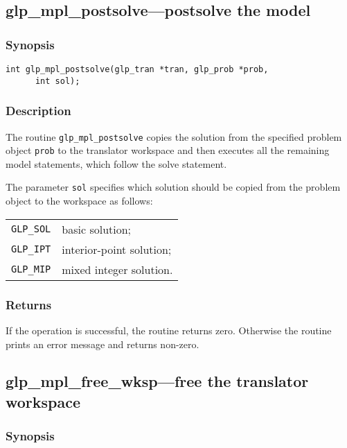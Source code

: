 \subsection{glp\_mpl\_postsolve---postsolve the model}

\subsubsection*{Synopsis}

\begin{verbatim}
int glp_mpl_postsolve(glp_tran *tran, glp_prob *prob,
      int sol);
\end{verbatim}

\subsubsection*{Description}

The routine \verb|glp_mpl_postsolve| copies the solution from the
specified problem object \verb|prob| to the translator workspace and
then executes all the remaining model statements, which follow the
solve statement.

The parameter \verb|sol| specifies which solution should be copied
from the problem object to the workspace as follows:

\begin{tabular}{@{}ll}
\verb|GLP_SOL| & basic solution; \\
\verb|GLP_IPT| & interior-point solution; \\
\verb|GLP_MIP| & mixed integer solution. \\
\end{tabular}

\subsubsection*{Returns}

If the operation is successful, the routine returns zero. Otherwise
the routine prints an error message and returns non-zero.

\subsection{glp\_mpl\_free\_wksp---free the translator workspace}

\subsubsection*{Synopsis}

